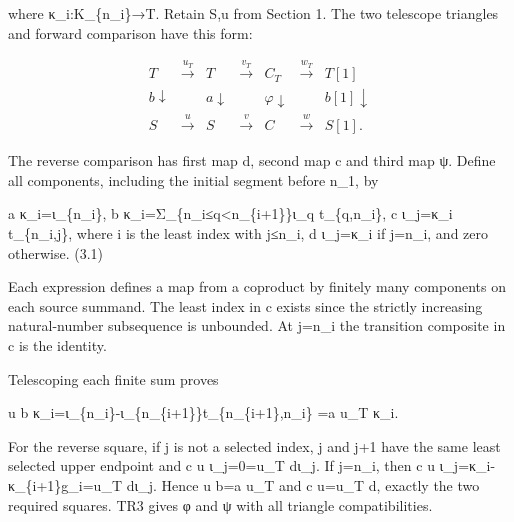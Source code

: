 \documentclass[11pt]{article}
\begin{document}
where κ\_\allowbreak{}i:\allowbreak{}K\_\allowbreak{}\{n\_\allowbreak{}i\}\allowbreak{}→T. Retain S,\allowbreak{}u from Section 1. The two telescope triangles and forward comparison have this form:\allowbreak{}

\[
\begin{array}{ccccccc}
T&\xrightarrow{u_T}&T&\xrightarrow{v_T}&C_T&\xrightarrow{w_T}&T[1]\\
\scriptstyle b\downarrow&&\scriptstyle a\downarrow&&\scriptstyle φ\downarrow&&\scriptstyle b[1]\downarrow\\
S&\xrightarrow{u}&S&\xrightarrow{v}&C&\xrightarrow{w}&S[1].
\end{array}
\]

The reverse comparison has first map d,\allowbreak{} second map c and third map ψ. Define all components,\allowbreak{} including the initial segment before n\_\allowbreak{}1,\allowbreak{} by

a κ\_\allowbreak{}i\allowbreak{}=ι\_\allowbreak{}\{n\_\allowbreak{}i\},\allowbreak{} b κ\_\allowbreak{}i\allowbreak{}=Σ\_\allowbreak{}\{n\_\allowbreak{}i≤q<n\_\allowbreak{}\{i\allowbreak{}+1\}\}ι\_\allowbreak{}q t\_\allowbreak{}\{q,\allowbreak{}n\_\allowbreak{}i\},\allowbreak{} c ι\_\allowbreak{}j\allowbreak{}=κ\_\allowbreak{}i t\_\allowbreak{}\{n\_\allowbreak{}i,\allowbreak{}j\},\allowbreak{} where i is the least index with j≤n\_\allowbreak{}i,\allowbreak{} d ι\_\allowbreak{}j\allowbreak{}=κ\_\allowbreak{}i if j\allowbreak{}=n\_\allowbreak{}i,\allowbreak{} and zero otherwise. (3.1)\allowbreak{}

Each expression defines a map from a coproduct by finitely many components on each source summand. The least index in c exists since the strictly increasing natural-number subsequence is unbounded. At j\allowbreak{}=n\_\allowbreak{}i the transition composite in c is the identity.

Telescoping each finite sum proves

u b κ\_\allowbreak{}i\allowbreak{}=ι\_\allowbreak{}\{n\_\allowbreak{}i\}-ι\_\allowbreak{}\{n\_\allowbreak{}\{i\allowbreak{}+1\}\}t\_\allowbreak{}\{n\_\allowbreak{}\{i\allowbreak{}+1\},\allowbreak{}n\_\allowbreak{}i\} \allowbreak{}=a u\_\allowbreak{}T κ\_\allowbreak{}i.

For the reverse square,\allowbreak{} if j is not a selected index,\allowbreak{} j and j\allowbreak{}+1 have the same least selected upper endpoint and c u ι\_\allowbreak{}j\allowbreak{}=0\allowbreak{}=u\_\allowbreak{}T dι\_\allowbreak{}j. If j\allowbreak{}=n\_\allowbreak{}i,\allowbreak{} then c u ι\_\allowbreak{}j\allowbreak{}=κ\_\allowbreak{}i-κ\_\allowbreak{}\{i\allowbreak{}+1\}g\_\allowbreak{}i\allowbreak{}=u\_\allowbreak{}T dι\_\allowbreak{}j. Hence u b\allowbreak{}=a u\_\allowbreak{}T and c u\allowbreak{}=u\_\allowbreak{}T d,\allowbreak{} exactly the two required squares. TR3 gives φ and ψ with all triangle compatibilities.
\end{document}
